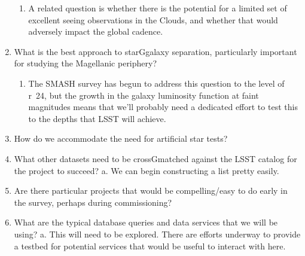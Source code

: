 \begin{enumerate}
{\begin{enumerate}
\item{A related question is whether there is the potential for a limited set of  excellent seeing observations in the Clouds, and whether that would  adversely impact the global cadence.  }
\end{enumerate}
}
\item{What is the best approach to starGgalaxy separation, particularly important  for studying the Magellanic periphery?  
\begin{enumerate}
\item{The SMASH survey has begun to address this question to the level of  r~24, but the growth in the galaxy luminosity function at faint  magnitudes means that we’ll probably need a dedicated effort to test  this to the depths that LSST will achieve.  }
\end{enumerate}
}
\item How do we accommodate the need for artificial star tests?  
\item{What other datasets need to be crossGmatched against the LSST catalog for  
the project to succeed?  a. We can begin constructing a list pretty easily.  }
\item{Are there particular projects that would be compelling/easy to do early in  the survey, perhaps during commissioning?  }
\item{What are the typical database queries and data services that we will be  using?   
a. This will need to be explored. There are efforts underway to provide a  testbed for potential services that would be useful to interact with  here.  }
\end{enumerate}

